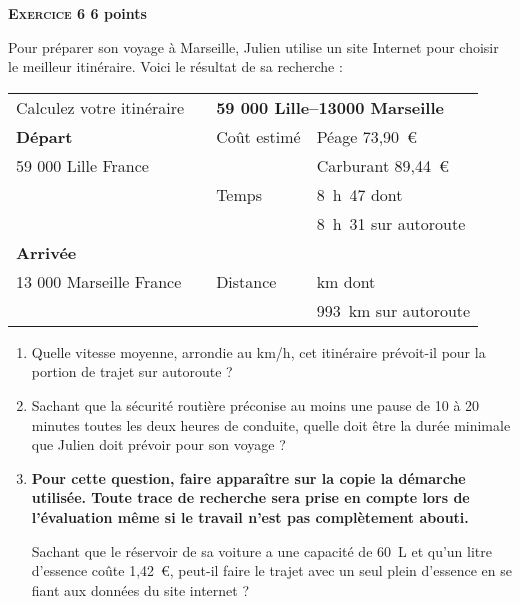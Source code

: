\textbf{\textsc{Exercice 6} \hfill 6 points}

\medskip
 
Pour préparer son voyage à Marseille, Julien utilise un site Internet pour choisir le meilleur itinéraire. Voici le résultat de sa recherche : 

\begin{center}
\begin{tabularx}{\linewidth}{|l|m{1cm}|l X|}\hline
Calculez votre itinéraire	&	&\multicolumn{2}{|l|}{\textbf{59 000 Lille--13000 Marseille}}\\
\textbf{Départ}				&	&Coût estimé&Péage 73,90~\euro\\
59 000 Lille  France		&	&			&Carburant 89,44~\euro\\
							&	&Temps		&8~h~47 dont\\
							&	&			&8~h~31 sur autoroute\\
\textbf{Arrivée}			&	&			&\\
13 000 Marseille France		&	&Distance	&\np{1004} km dont\\
							&	&			&993~km sur autoroute\\ \hline
\end{tabularx}
\end{center}

\begin{enumerate}
\item Quelle vitesse moyenne, arrondie au km/h, cet itinéraire prévoit-il pour la portion de trajet sur autoroute ? 
\item Sachant que la sécurité routière préconise au moins une pause de 10 à 20 minutes toutes les deux heures de conduite, quelle doit être la durée minimale que Julien doit prévoir pour son voyage ? 

\medskip

 
\item \textbf{Pour cette question, faire apparaître sur la copie la démarche utilisée. Toute trace de recherche sera prise en compte lors de l'évaluation même si le travail n'est pas complètement abouti.}

Sachant que le réservoir de sa voiture a une capacité de 60~L et qu'un litre d'essence coûte 1,42~\euro, peut-il faire le trajet avec un seul plein d'essence en se fiant aux données du site internet ?
\end{enumerate}
 
\vspace{0,5cm}

